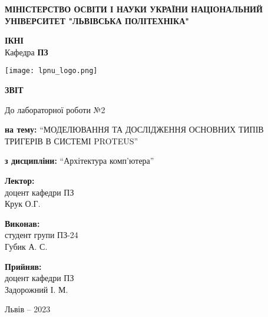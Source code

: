 \documentclass[12pt]{extarticle}
\begin{document}
\begin{titlepage}
    \begin{center}
        \textbf{\normalsize{\MakeUppercase{
            Міністерство Освіти і науки України
            Національний університет "Львівська політехніка"
        }}}

        \begin{flushright}
        \textbf{ІКНІ}\\
        Кафедра \textbf{ПЗ}
        \end{flushright}
        \vspace{15mm}

        \texttt{[image: lpnu\_logo.png]}

        \vspace*{\fill}

        \textbf{\normalsize{\MakeUppercase{Звіт}}}
            
        До лабораторної роботи №2

        \textbf{на тему:} “МОДЕЛЮВАННЯ ТА ДОСЛІДЖЕННЯ ОСНОВНИХ ТИПІВ ТРИГЕРІВ В
СИСТЕМІ PROTEUS”

        \textbf{з дисципліни:} “Архітектура комп’ютера”
            
        \vspace*{\fill}

        \begin{flushright}

            \textbf{Лектор:}\\
            доцент кафедри ПЗ\\
            Крук О.Г.\\
            \vspace{12pt}

            \textbf{Виконав:}\\
            студент групи ПЗ-24\\
            Губик А. С.\\
            \vspace{12pt}

            \textbf{Прийняв:}\\
            доцент кафедри ПЗ\\
            Задорожний І. М.\\
        \vspace{12pt}
        \end{flushright}

        Львів -- 2023
            
            
    \end{center}
\end{titlepage}
\end{document}

